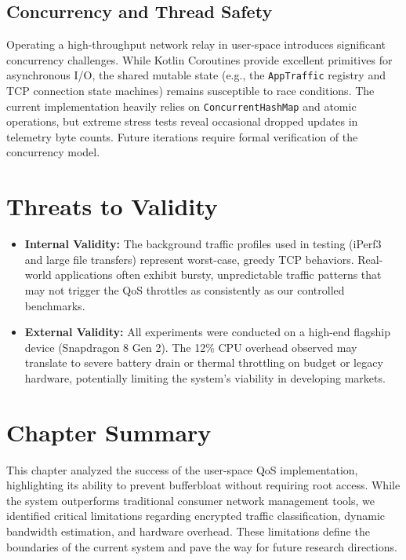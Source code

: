 \subsection{Concurrency and Thread Safety}
Operating a high-throughput network relay in user-space introduces significant concurrency challenges. While Kotlin Coroutines provide excellent primitives for asynchronous I/O, the shared mutable state (e.g., the \texttt{AppTraffic} registry and TCP connection state machines) remains susceptible to race conditions. The current implementation heavily relies on \texttt{ConcurrentHashMap} and atomic operations, but extreme stress tests reveal occasional dropped updates in telemetry byte counts. Future iterations require formal verification of the concurrency model.

\section{Threats to Validity}
\label{sec:threats_validity}

\begin{itemize}
    \item \textbf{Internal Validity:} The background traffic profiles used in testing (iPerf3 and large file transfers) represent worst-case, greedy TCP behaviors. Real-world applications often exhibit bursty, unpredictable traffic patterns that may not trigger the QoS throttles as consistently as our controlled benchmarks.
    \item \textbf{External Validity:} All experiments were conducted on a high-end flagship device (Snapdragon 8 Gen 2). The 12\% CPU overhead observed may translate to severe battery drain or thermal throttling on budget or legacy hardware, potentially limiting the system's viability in developing markets.
\end{itemize}

\section{Chapter Summary}
\label{sec:ch9_summary}

This chapter analyzed the success of the user-space QoS implementation, highlighting its ability to prevent bufferbloat without requiring root access. While the system outperforms traditional consumer network management tools, we identified critical limitations regarding encrypted traffic classification, dynamic bandwidth estimation, and hardware overhead. These limitations define the boundaries of the current system and pave the way for future research directions.
